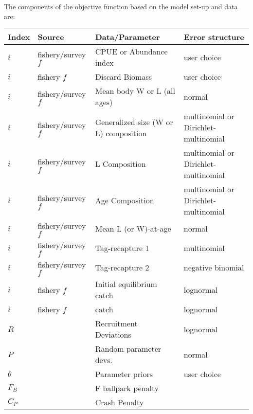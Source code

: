 The components of the objective function based on the model set-up and data are: 
\begin{longtable}{p{1cm} p{2.75cm} p{4.75cm} p{6.5cm}}
	\hline
	Index & Source & Data/Parameter & Error structure \Tstrut\Bstrut\\
	\hline	
	$i$ & fishery/survey $f$ & CPUE or Abundance index	 & user choice \Tstrut\\
	$i$ & fishery $f$		 & Discard Biomass			 & user choice \Tstrut\\
	$i$ & fishery/survey $f$ & Mean body W or L (all ages) & normal \Tstrut\\
	$i$ & fishery/survey $f$ & Generalized size (W or L) composition & multinomial or Dirichlet-multinomial \Tstrut\\
	$i$ & fishery/survey $f$ & L Composition	 		 & multinomial or Dirichlet-multinomial \Tstrut\\
	$i$ & fishery/survey $f$ & Age Composition			 & multinomial or Dirichlet-multinomial \Tstrut\\
	$i$ & fishery/survey $f$ & Mean L (or W)-at-age 	 & normal \Tstrut\\
	$i$ & fishery/survey $f$ & Tag-recapture 1			 & multinomial \Tstrut\\
	$i$ & fishery/survey $f$ & Tag-recapture 2			 & negative binomial \Tstrut\\
	$i$ & fishery $f$		 & Initial equilibrium catch & lognormal \Tstrut\\
	$i$ & fishery $f$		 & catch					 & lognormal \Tstrut\\
	$R$ & 					 & Recruitment Deviations	 & lognormal \Tstrut\\
	$P$ & 					 & Random parameter devs. 	 & normal \Tstrut\\
	$\theta$ & 				 & Parameter priors			 & user choice \Tstrut\\
	$F_B$ & 				 & F ballpark penalty		 & \Tstrut\\
	$C_P$ &					 & Crash Penalty			 & \Tstrut\Bstrut\\
	\hline
\end{longtable}




\pagebreak